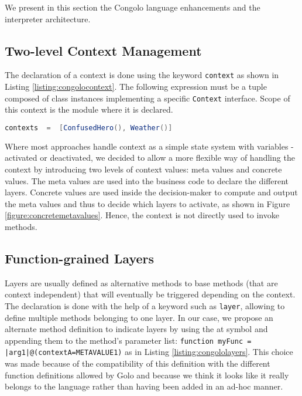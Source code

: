 \documentclass{sig-alternate}
\begin{document}
We present in this section the Congolo language enhancements and the interpreter architecture.

\subsection{Two-level Context Management}

The declaration of a context is done using the keyword \lstinline|context| as shown in Listing \ref{listing:congolocontext}. The following expression must be a tuple composed of class instances implementing a specific \lstinline!Context! interface. Scope of this context is the module where it is declared.

\begin{lstlisting}[float, language=Java, caption=Congolo context example, label={listing:congolocontext}]
contexts  =  [ConfusedHero(), Weather()]
\end{lstlisting}

Where most approaches handle context as a simple state system with variables - activated or deactivated, we decided to allow a more flexible way of handling the context by introducing two levels of context values: meta values and concrete values. The meta values are used into the business code to declare the different layers. Concrete values are used inside the decision-maker to compute and output the meta values and thus to decide which layers to activate, as shown in Figure \ref{figure:concretemetavalues}. Hence, the context is not directly used to invoke methods.

\subsection{Function-grained Layers}

\label{subsection:layers}
Layers are usually defined as alternative methods to base methods (that are context independent) that will eventually be triggered depending on the context. The declaration is done with the help of a keyword such as \lstinline|layer|, allowing to define multiple methods belonging to one layer. In our case, we propose an alternate method definition to indicate layers by using the at symbol and appending them to the method's parameter list: \lstinline!function myFunc = |arg1|@(contextA=METAVALUE1)! as in Listing \ref{listing:congololayers}. This choice was made because of the compatibility of this definition with the different function definitions allowed by Golo and because we think it looks like it really belongs to the language rather than having been added in an ad-hoc manner.
\end{document}

